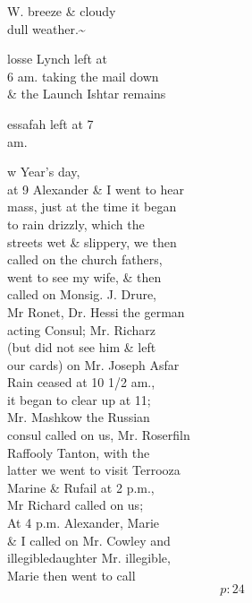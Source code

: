 \documentclass{report}
\begin{document}
	\par{
 	W. breeze \& cloudy\ \\dull weather.\~{}\ \\
	}

	\par{
 	losse Lynch left at\ \\6 am. taking the mail down\ \\\& the Launch Ishtar remains\ \\
	}

	\par{
 	essafah left at 7\ \\am.\ \\
	}

	\par{
 	w Year's day,\ \\at 9 Alexander \& I went to hear\ \\mass, just at the time it began\ \\to rain drizzly, which the\ \\streets wet \& slippery, we then\ \\called on the church fathers,\ \\went to see my wife, \& then\ \\called on Monsig. J. Drure,\ \\Mr Ronet, Dr. Hessi the german\ \\acting Consul; Mr. Richarz\ \\(but did not see him \& left\ \\our cards) on Mr. Joseph Asfar\ \\Rain ceased at 10 1/2 am.,\ \\it began to clear up at 11;\ \\Mr. Mashkow the Russian\ \\consul called on us, Mr. Roserfiln\ \\Raffooly Tanton, with the\ \\latter we went to visit Terrooza\ \\Marine \& Rufail at 2 p.m.,\ \\Mr Richard called on us;\ \\At 4 p.m. Alexander, Marie\ \\\& I called on Mr. Cowley and\ \\\lbrack illegible\rbrack daughter Mr. \lbrack illegible\rbrack ,\ \\Marie then went to call\ \\
  \[p: 24 \]

	}
\end{document}
